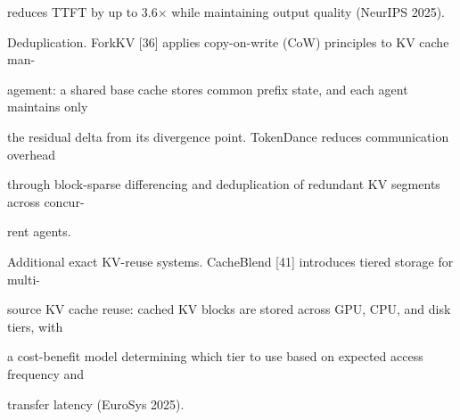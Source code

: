 \begin{flushleft}
\noindent reduces TTFT by up to 3.6× while maintaining output quality (NeurIPS 2025).\par
\par\smallskip
\noindent Deduplication. ForkKV [36] applies copy-on-write (CoW) principles to KV cache man-\par
\noindent agement: a shared base cache stores common prefix state, and each agent maintains only\par
\noindent the residual delta from its divergence point. TokenDance reduces communication overhead\par
\noindent through block-sparse differencing and deduplication of redundant KV segments across concur-\par
\noindent rent agents.\par
\par\smallskip
\noindent Additional exact KV-reuse systems. CacheBlend [41] introduces tiered storage for multi-\par
\noindent source KV cache reuse: cached KV blocks are stored across GPU, CPU, and disk tiers, with\par
\noindent a cost-benefit model determining which tier to use based on expected access frequency and\par
\noindent transfer latency (EuroSys 2025).\par
\end{flushleft}
